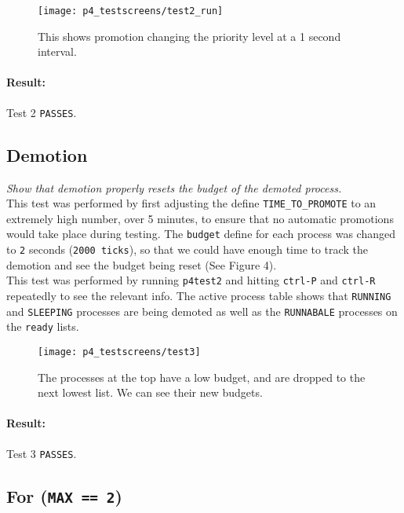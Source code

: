 \documentclass[11pt,letterpaper]{report}
\begin{document}
\begin{figure}
	\centering
	\texttt{[image: p4\_testscreens/test2\_run]}
	\caption{This shows promotion changing the priority level at a 1 second interval.}
	\label{fig:test2run}
\end{figure}

	\paragraph{Result:}Test 2 {\tt PASSES}.
	
	\subsection{Demotion}
	\emph{Show that demotion properly resets the budget of the demoted process.}\\
	
	This test was performed by first adjusting the define {\tt TIME\_TO\_PROMOTE} to an extremely high number, over 5 minutes, to ensure that no automatic promotions would take place during testing. The {\tt budget} define for each process was changed to {\tt 2} seconds ({\tt 2000 ticks}), so that we could have enough time to track the demotion and see the budget being reset (See {\color{red} Figure 4}).\\
	This test was performed by running {\tt p4test2} and hitting {\tt ctrl-P} and {\tt ctrl-R} repeatedly to see the relevant info. The active process table shows that {\tt RUNNING} and {\tt SLEEPING} processes are being demoted as well as the {\tt RUNNABALE} processes on the {\tt ready} lists.
	
\begin{figure}
	\centering
	\texttt{[image: p4\_testscreens/test3]}
	\caption{The processes at the top have a low budget, and are dropped to the next lowest list. We can see their new budgets.}
	\label{fig:test3}
\end{figure}

	\paragraph{Result:}Test 3 {\tt PASSES}.
	
	\subsection{For ({\tt MAX == 2})}
	
\end{document}
